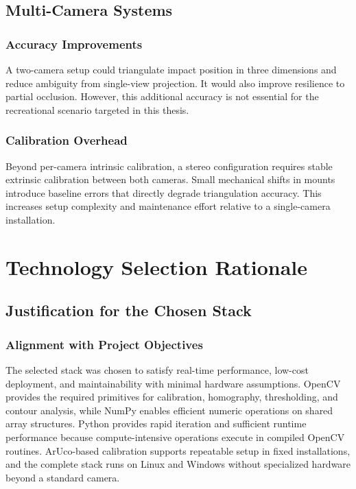\subsection{Multi-Camera Systems}

\subsubsection{Accuracy Improvements}
A two-camera setup could triangulate impact position in three dimensions and reduce ambiguity from single-view projection. It would also improve resilience to partial occlusion. However, this additional accuracy is not essential for the recreational scenario targeted in this thesis.

\subsubsection{Calibration Overhead}
Beyond per-camera intrinsic calibration, a stereo configuration requires stable extrinsic calibration between both cameras. Small mechanical shifts in mounts introduce baseline errors that directly degrade triangulation accuracy. This increases setup complexity and maintenance effort relative to a single-camera installation.

\section{Technology Selection Rationale}

\subsection{Justification for the Chosen Stack}

\subsubsection{Alignment with Project Objectives}
The selected stack was chosen to satisfy real-time performance, low-cost deployment, and maintainability with minimal hardware assumptions. OpenCV provides the required primitives for calibration, homography, thresholding, and contour analysis, while NumPy enables efficient numeric operations on shared array structures. Python provides rapid iteration and sufficient runtime performance because compute-intensive operations execute in compiled OpenCV routines. ArUco-based calibration supports repeatable setup in fixed installations, and the complete stack runs on Linux and Windows without specialized hardware beyond a standard camera.